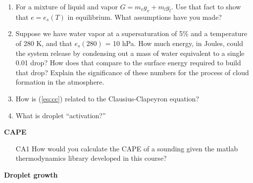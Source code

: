 \documentclass[12pt]{article}
\begin{document}
\begin{enumerate}
\item  For a mixture of liquid and vapor $G=m_v g_v + m_l g_l$.  
Use that fact to
show that $e=e_s(T)$ in equilibrium.  What assumptions have you made?

\item Suppose we have water vapor at a supersaturation of 5\% and a
  temperature of 280 K, and that $e_s(280)$ = 10 hPa.  
How much energy, in Joules, could the system
  release by condensing out a mass of water equivalent to a single
  0.01 \mum drop?  How does that compare to the surface energy
  required to build that drop?  Explain the significance of these
  numbers for the process of cloud formation in the atmosphere.


\item How is  (\ref{eq:cc}) related to the Clausius-Clapeyron equation?


\item What is droplet ``activation?''



\end{enumerate}



\textbf{CAPE}

\begin{enumerate}
\item[CA1]  How would you calculate the CAPE of a sounding given the
matlab thermodynamics library developed in this course?
\end{enumerate}

\textbf{Droplet growth}
\end{document}
